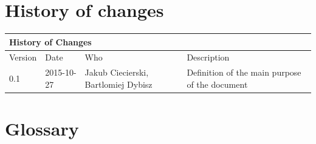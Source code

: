 \documentclass{article}
\begin{document}
\section*{History of changes}

\begin{table}[h]
\hspace*{-4.1cm}
\large
\begin{tabular}{|l|l|l|l|}
\hline
\multicolumn{4}{|l|}{\cellcolor[HTML]{C0C0C0}History of Changes} \\ \hline
Version         & Date         & Who        & Description        \\ \hline

0.1         
& 2015-10-27         
& Jakub Ciecierski, Bartlomiej Dybisz
& Definition of the main purpose of the document       \\ \hline
\end{tabular}
\end{table}


\newpage
\section{Glossary}


\end{document}
